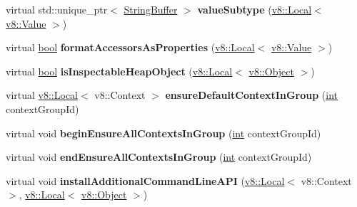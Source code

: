 \begin{DoxyCompactItemize}
virtual std\+::unique\+\_\+ptr$<$ \mbox{\hyperlink{classv8__inspector_1_1StringBuffer}{String\+Buffer}} $>$ {\bfseries value\+Subtype} (\mbox{\hyperlink{classv8_1_1Local}{v8\+::\+Local}}$<$ \mbox{\hyperlink{classv8_1_1Value}{v8\+::\+Value}} $>$)
\item 
\mbox{\label{classv8__inspector_1_1V8InspectorClient_ae9d50c9ea6716879281ca401fbe8114a}} 
virtual \mbox{\hyperlink{classbool}{bool}} {\bfseries format\+Accessors\+As\+Properties} (\mbox{\hyperlink{classv8_1_1Local}{v8\+::\+Local}}$<$ \mbox{\hyperlink{classv8_1_1Value}{v8\+::\+Value}} $>$)
\item 
\mbox{\label{classv8__inspector_1_1V8InspectorClient_a0871bb7e065494f174e445845b56f30c}} 
virtual \mbox{\hyperlink{classbool}{bool}} {\bfseries is\+Inspectable\+Heap\+Object} (\mbox{\hyperlink{classv8_1_1Local}{v8\+::\+Local}}$<$ \mbox{\hyperlink{classv8_1_1Object}{v8\+::\+Object}} $>$)
\item 
\mbox{\label{classv8__inspector_1_1V8InspectorClient_a8b47c57ccc57f386570e1148a2efe38a}} 
virtual \mbox{\hyperlink{classv8_1_1Local}{v8\+::\+Local}}$<$ v8\+::\+Context $>$ {\bfseries ensure\+Default\+Context\+In\+Group} (\mbox{\hyperlink{classint}{int}} context\+Group\+Id)
\item 
\mbox{\label{classv8__inspector_1_1V8InspectorClient_a004987bc7b929f12a39d3e1cc7804a05}} 
virtual void {\bfseries begin\+Ensure\+All\+Contexts\+In\+Group} (\mbox{\hyperlink{classint}{int}} context\+Group\+Id)
\item 
\mbox{\label{classv8__inspector_1_1V8InspectorClient_affc437fd3eb8e2294b1e9d6ad8bf8dad}} 
virtual void {\bfseries end\+Ensure\+All\+Contexts\+In\+Group} (\mbox{\hyperlink{classint}{int}} context\+Group\+Id)
\item 
\mbox{\label{classv8__inspector_1_1V8InspectorClient_acbc688fd17d8c8a29435c4533f9e1f43}} 
virtual void {\bfseries install\+Additional\+Command\+Line\+A\+PI} (\mbox{\hyperlink{classv8_1_1Local}{v8\+::\+Local}}$<$ v8\+::\+Context $>$, \mbox{\hyperlink{classv8_1_1Local}{v8\+::\+Local}}$<$ \mbox{\hyperlink{classv8_1_1Object}{v8\+::\+Object}} $>$)

\end{DoxyCompactItemize}
